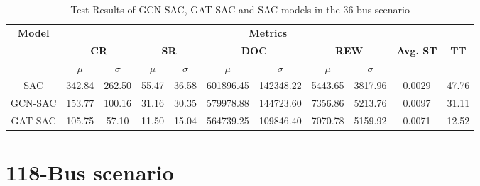\begin{table}[H]
	\centering
	\caption{Test Results of GCN-SAC, GAT-SAC and SAC models in the 36-bus scenario}
	\begin{tabular}{ccccccccccc}
		\toprule
		\multirow{3}{*}{\textbf{Model}} & \multicolumn{10}{c}{\textbf{Metrics}} \\ 
		\cmidrule(lr){2-10}
		&  \multicolumn{2}{c}{\textbf{CR}} &\multicolumn{2}{c}{\textbf{SR}} & \multicolumn{2}{c}{\textbf{DOC}} & \multicolumn{2}{c}{\textbf{REW}} & \multirow{2}{*}{\textbf{Avg. ST}} & \multirow{2}{*}{\textbf{TT}} \\ 
		& $\mu$ & $\sigma$ & $\mu$ & $\sigma$ & $\mu$ & $\sigma$ & $\mu$ & $\sigma$ & & \\
		\midrule
		SAC & 342.84 & 262.50 & 55.47 & 36.58 & 601896.45 & 142348.22 & 5443.65 & 3817.96 & 0.0029 & 47.76 \\
		GCN-SAC & 153.77 & 100.16 & 31.16 & 30.35 & 579978.88 & 144723.60 & 7356.86 & 5213.76 & 0.0097 & 31.11 \\
		GAT-SAC & 105.75 & 57.10 & 11.50 & 15.04 & 564739.25 & 109846.40 &  7070.78 & 5159.92 & 0.0071 & 12.52 \\
		\bottomrule
	\end{tabular}
	\label{tab:test-362}
\end{table}


\section{118-Bus scenario}

